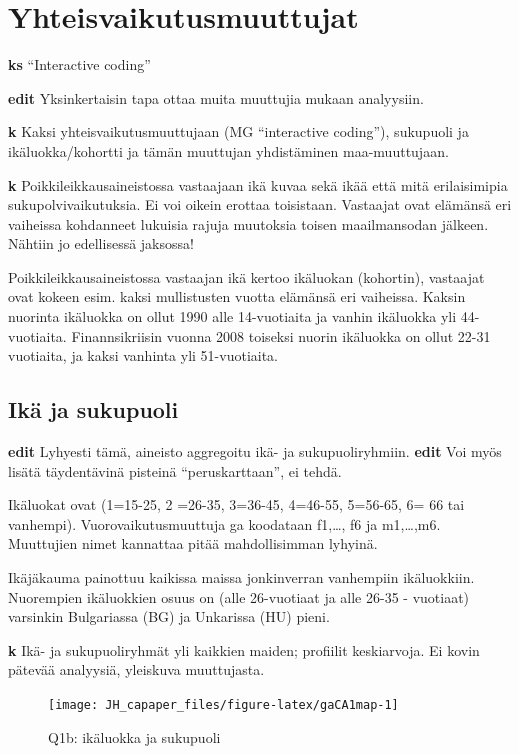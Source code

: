 \documentclass[
  finnish,
]{book}
\begin{document}
\hypertarget{yhteisvaikutusmuuttujat}{%
\chapter{Yhteisvaikutusmuuttujat}\label{yhteisvaikutusmuuttujat}}

\textbf{ks} ``Interactive coding''

\textbf{edit} Yksinkertaisin tapa ottaa muita muuttujia mukaan analyysiin.

\textbf{k} Kaksi yhteisvaikutusmuuttujaan (MG ``interactive coding''), sukupuoli ja
ikäluokka/kohortti ja tämän muuttujan yhdistäminen maa-muuttujaan.

\textbf{k} Poikkileikkausaineistossa vastaajaan ikä kuvaa sekä ikää että mitä erilaisimipia
sukupolvivaikutuksia. Ei voi oikein erottaa toisistaan. Vastaajat ovat elämänsä eri
vaiheissa kohdanneet lukuisia rajuja muutoksia toisen maailmansodan jälkeen. Nähtiin
jo edellisessä jaksossa!

Poikkileikkausaineistossa vastaajan ikä kertoo ikäluokan (kohortin), vastaajat ovat
kokeen esim. kaksi mullistusten vuotta elämänsä eri vaiheissa. Kaksin nuorinta ikäluokka
on ollut 1990 alle 14-vuotiaita ja vanhin ikäluokka yli 44-vuotiaita. Finannsikriisin
vuonna 2008 toiseksi nuorin ikäluokka on ollut 22-31 vuotiaita, ja kaksi vanhinta
yli 51-vuotiaita.

\hypertarget{ikuxe4-ja-sukupuoli}{%
\section{Ikä ja sukupuoli}\label{ikuxe4-ja-sukupuoli}}

\textbf{edit} Lyhyesti tämä, aineisto aggregoitu ikä- ja sukupuoliryhmiin.
\textbf{edit} Voi myös lisätä täydentävinä pisteinä ``peruskarttaan'', ei tehdä.

Ikäluokat ovat (1=15-25, 2 =26-35, 3=36-45, 4=46-55, 5=56-65, 6= 66 tai vanhempi).
Vuorovaikutusmuuttuja ga koodataan f1,\ldots, f6 ja m1,\ldots,m6. Muuttujien nimet
kannattaa pitää mahdollisimman lyhyinä.

Ikäjäkauma painottuu kaikissa maissa jonkinverran vanhempiin ikäluokkiin.
Nuorempien ikäluokkien osuus on (alle 26-vuotiaat ja alle 26-35 - vuotiaat)
varsinkin Bulgariassa (BG) ja Unkarissa (HU) pieni.

\textbf{k} Ikä- ja sukupuoliryhmät yli kaikkien maiden; profiilit keskiarvoja. Ei kovin
pätevää analyysiä, yleiskuva muuttujasta.

\begin{figure}

{\centering \texttt{[image: JH\_capaper\_files/figure-latex/gaCA1map-1]} 

}

\caption{Q1b: ikäluokka ja sukupuoli}\label{fig:gaCA1map}
\end{figure}
\end{document}
